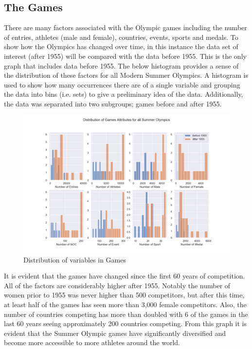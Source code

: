 \documentclass[a4 paper, 12pt]{article}
\begin{document}
    \subsection{The Games}
    There are many factors associated with the Olympic games including the number of entries, athletes (male and female), countries, events, sports and medals. To show how the Olympics has changed over time, in this instance the data set of interest (after 1955) will be compared with the data before 1955. This is the only graph that includes data before 1955. The below histogram provides a sense of the distribution of these factors for all Modern Summer Olympics. A histogram is used to show how many occurrences there are of a single variable and grouping the data into bins (i.e. sets) to give a preliminary idea of the data. Additionally, the data was separated into two subgroups; games before and after 1955.
        \begin{figure} [H]
            \centering
            \includegraphics[width=\textwidth, frame]
                {./images/graph/games_histogram.png}      
                \caption{Distribution of variables in Games} 
        \end{figure}
    It is evident that the games have changed since the first 60 years of competition. All of the factors are considerably higher after 1955. Notably the number of women prior to 1955 was never higher than 500 competitors, but after this time, at least half of the games has seen more than 3,000 female competitors. Also, the number of countries competing has more than doubled with 6 of the games in the last 60 years seeing approximately 200 countries competing. From this graph it is evident that the Summer Olympic games have significantly diversified and become more accessible to more athletes around the world.
\end{document}
